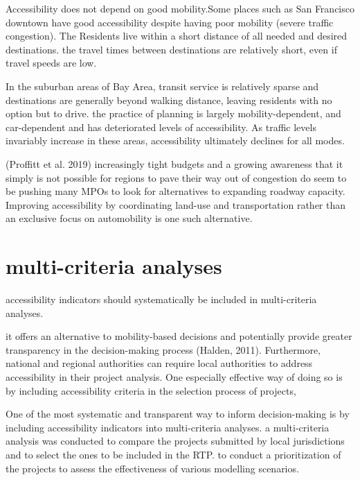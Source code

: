 \documentclass[12pt,]{article}
\begin{document}
Accessibility does not depend on good mobility.Some places such as San
Francisco downtown have good accessibility despite having poor mobility
(severe traffic congestion). The Residents live within a short distance
of all needed and desired destinations. the travel times between
destinations are relatively short, even if travel speeds are low.

In the suburban areas of Bay Area, transit service is relatively sparse
and destinations are generally beyond walking distance, leaving
residents with no option but to drive. the practice of planning is
largely mobility-dependent, and car-dependent and has deteriorated
levels of accessibility. As traffic levels invariably increase in these
areas, accessibility ultimately declines for all modes.

(Proffitt et al. 2019) increasingly tight budgets and a growing
awareness that it simply is not possible for regions to pave their way
out of congestion do seem to be pushing many MPOs to look for
alternatives to expanding roadway capacity. Improving accessibility by
coordinating land-use and transportation rather than an exclusive focus
on automobility is one such alternative.

\hypertarget{multi-criteria-analyses}{%
\section{multi-criteria analyses}\label{multi-criteria-analyses}}

accessibility indicators should systematically be included in
multi-criteria analyses.

it offers an alternative to mobility-based decisions and potentially
provide greater transparency in the decision-making process (Halden,
2011). Furthermore, national and regional authorities can require local
authorities to address accessibility in their project analysis. One
especially effective way of doing so is by including accessibility
criteria in the selection process of projects,

One of the most systematic and transparent way to inform decision-making
is by including accessibility indicators into multi-criteria analyses. a
multi-criteria analysis was conducted to compare the projects submitted
by local jurisdictions and to select the ones to be included in the RTP.
to conduct a prioritization of the projects to assess the effectiveness
of various modelling scenarios.
\end{document}
